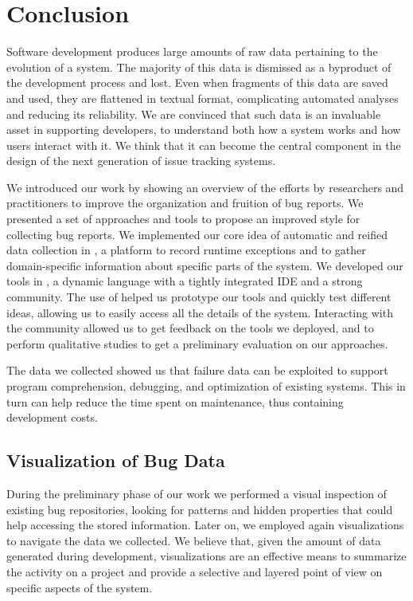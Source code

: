 
\chapter{Conclusion}\label{ch:conclusion}


Software development produces large amounts of raw data pertaining to the evolution of a system.
The majority of this data is dismissed as a byproduct of the development process and lost.
Even when fragments of this data are saved and used, they are flattened in textual format, complicating automated analyses and reducing its reliability.
We are convinced that such data is an invaluable asset in supporting developers, to understand both how a system works and how users interact with it.
We think that it can become the central component in the design of the next generation of issue tracking systems.

We introduced our work by showing an overview of the efforts by researchers and practitioners to improve the organization and fruition of bug reports.
We presented a set of approaches and tools to propose an improved style for collecting bug reports.
We implemented our core idea of automatic and reified data collection in \sln, a platform to record runtime exceptions and to gather domain-specific information about specific parts of the system.
We developed our tools in \pha, a dynamic language with a tightly integrated IDE and a strong community.
The use of \pha helped us prototype our tools and quickly test different ideas, allowing us to easily access all the details of the system.
Interacting with the \pha community allowed us to get feedback on the tools we deployed, and to perform qualitative studies to get a preliminary evaluation on our approaches.

The data we collected showed us that failure data can be exploited to support program comprehension, debugging, and optimization of existing systems.
This in turn can help reduce the time spent on maintenance, thus containing development costs.


\section{Visualization of Bug Data}

During the preliminary phase of our work we performed a visual inspection of existing bug repositories, looking for patterns and hidden properties that could help accessing the stored information.
Later on, we employed again visualizations to navigate the data we collected.
We believe that, given the amount of data generated during development, visualizations are an effective means to summarize the activity on a project and provide a selective and layered point of view on specific aspects of the system.


